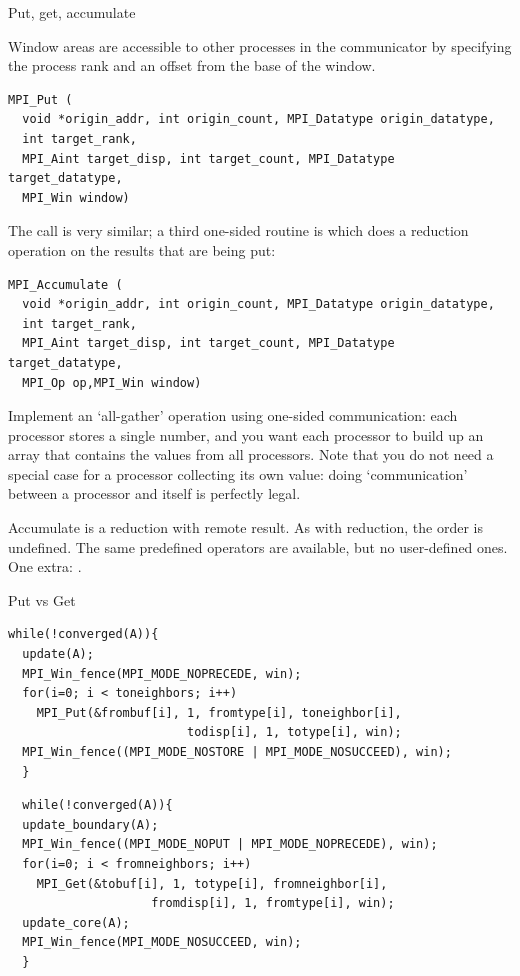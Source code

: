 
 {Put, get, accumulate}

Window areas are 
accessible to other processes in the communicator by specifying the
process rank and an offset from the base of the window.
\begin{verbatim}
MPI_Put (
  void *origin_addr, int origin_count, MPI_Datatype origin_datatype,
  int target_rank,
  MPI_Aint target_disp, int target_count, MPI_Datatype target_datatype,
  MPI_Win window)
\end{verbatim}
The  call is very similar; a third one-sided routine
is  which does a reduction operation on the results
that are being put:
\begin{verbatim}
MPI_Accumulate (
  void *origin_addr, int origin_count, MPI_Datatype origin_datatype, 
  int target_rank,
  MPI_Aint target_disp, int target_count, MPI_Datatype target_datatype,
  MPI_Op op,MPI_Win window)
\end{verbatim}

\begin{exercise}
  Implement an `all-gather' operation using one-sided communication:
  each processor stores a single number, and you want each processor
  to build up an array that contains the values from all
  processors. Note that you do not need a special case for a processor
  collecting its own value: doing `communication' between a processor
  and itself is perfectly legal.
\end{exercise}

Accumulate is a reduction with remote result. As with reduction, the 
order is undefined. The same predefined operators are available, but no
user-defined ones. One extra: .

 {Put vs Get}

\begin{verbatim}
while(!converged(A)){ 
  update(A); 
  MPI_Win_fence(MPI_MODE_NOPRECEDE, win); 
  for(i=0; i < toneighbors; i++) 
    MPI_Put(&frombuf[i], 1, fromtype[i], toneighbor[i], 
                         todisp[i], 1, totype[i], win); 
  MPI_Win_fence((MPI_MODE_NOSTORE | MPI_MODE_NOSUCCEED), win); 
  } 
\end{verbatim}
\begin{verbatim}
  while(!converged(A)){ 
  update_boundary(A); 
  MPI_Win_fence((MPI_MODE_NOPUT | MPI_MODE_NOPRECEDE), win); 
  for(i=0; i < fromneighbors; i++) 
    MPI_Get(&tobuf[i], 1, totype[i], fromneighbor[i], 
                    fromdisp[i], 1, fromtype[i], win); 
  update_core(A); 
  MPI_Win_fence(MPI_MODE_NOSUCCEED, win); 
  } 
\end{verbatim}

